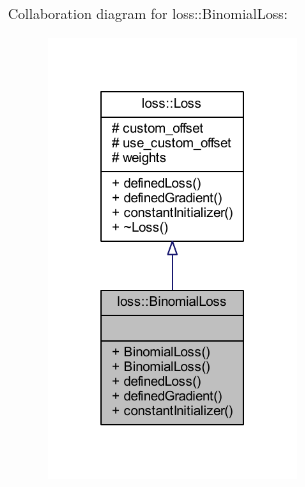 Collaboration diagram for loss\+:\+:Binomial\+Loss\+:
\nopagebreak
\begin{figure}[H]
\begin{center}
\leavevmode
\includegraphics[width=187pt]{classloss_1_1_binomial_loss__coll__graph}
\end{center}
\end{figure}
